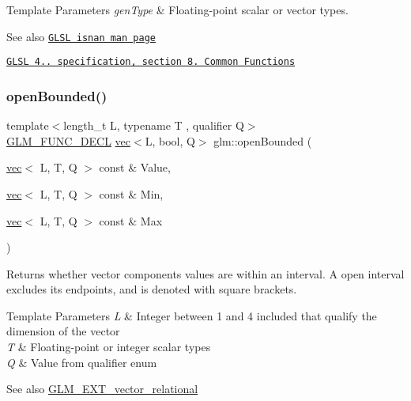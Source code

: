 \begin{DoxyTemplParams}{Template Parameters}
{\em gen\+Type} & Floating-\/point scalar or vector types.\\
\hline
\end{DoxyTemplParams}
\begin{DoxySeeAlso}{See also}
\href{http://www.opengl.org/sdk/docs/manglsl/xhtml/isnan.xml}{\tt G\+L\+SL isnan man page} 

\href{http://www.opengl.org/registry/doc/GLSLangSpec.4.20.8.pdf}{\tt G\+L\+SL 4.. specification, section 8. Common Functions} 
\end{DoxySeeAlso}
\mbox{\label{group__gtx__common_gafd303042ba2ba695bf53b2315f53f93f}} 
\subsubsection{\texorpdfstring{open\+Bounded()}{openBounded()}}
{\footnotesize\ttfamily template$<$length\+\_\+t L, typename T , qualifier Q$>$ \\
\hyperlink{setup_8hpp_ab2d052de21a70539923e9bcbf6e83a51}{G\+L\+M\+\_\+\+F\+U\+N\+C\+\_\+\+D\+E\+CL} \hyperlink{structglm_1_1vec}{vec}$<$L, bool, Q$>$ glm\+::open\+Bounded (\begin{DoxyParamCaption}\item[{\hyperlink{structglm_1_1vec}{vec}$<$ L, T, Q $>$ const \&}]{Value,  }\item[{\hyperlink{structglm_1_1vec}{vec}$<$ L, T, Q $>$ const \&}]{Min,  }\item[{\hyperlink{structglm_1_1vec}{vec}$<$ L, T, Q $>$ const \&}]{Max }\end{DoxyParamCaption})}

Returns whether vector components values are within an interval. A open interval excludes its endpoints, and is denoted with square brackets.


\begin{DoxyTemplParams}{Template Parameters}
{\em L} & Integer between 1 and 4 included that qualify the dimension of the vector \\
\hline
{\em T} & Floating-\/point or integer scalar types \\
\hline
{\em Q} & Value from qualifier enum\\
\hline
\end{DoxyTemplParams}
\begin{DoxySeeAlso}{See also}
\hyperlink{group__ext__vector__relational}{G\+L\+M\+\_\+\+E\+X\+T\+\_\+vector\+\_\+relational} 
\end{DoxySeeAlso}
